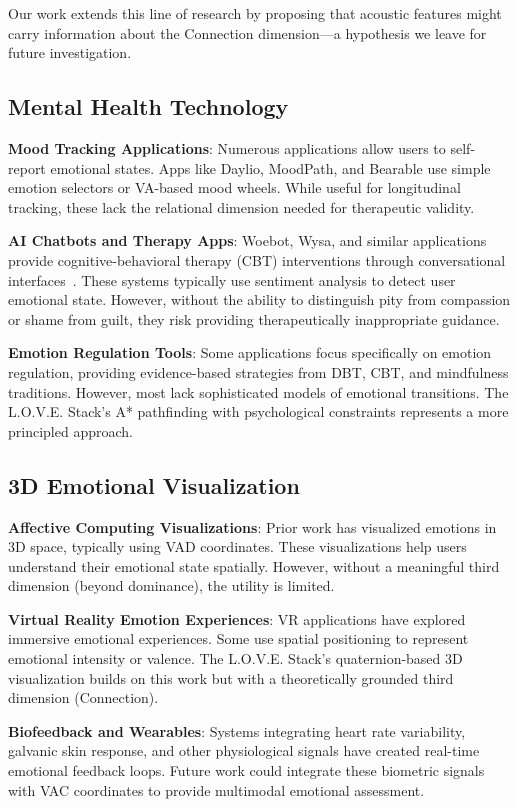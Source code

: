 Our work extends this line of research by proposing that acoustic features might carry information about the Connection dimension—a hypothesis we leave for future investigation.

\subsection{Mental Health Technology}

\textbf{Mood Tracking Applications}: Numerous applications allow users to self-report emotional states. Apps like Daylio, MoodPath, and Bearable use simple emotion selectors or VA-based mood wheels. While useful for longitudinal tracking, these lack the relational dimension needed for therapeutic validity.

\textbf{AI Chatbots and Therapy Apps}: Woebot, Wysa, and similar applications provide cognitive-behavioral therapy (CBT) interventions through conversational interfaces~\cite{fitzpatrick2017}. These systems typically use sentiment analysis to detect user emotional state. However, without the ability to distinguish pity from compassion or shame from guilt, they risk providing therapeutically inappropriate guidance.

\textbf{Emotion Regulation Tools}: Some applications focus specifically on emotion regulation, providing evidence-based strategies from DBT, CBT, and mindfulness traditions. However, most lack sophisticated models of emotional transitions. The L.O.V.E. Stack's A* pathfinding with psychological constraints represents a more principled approach.

\subsection{3D Emotional Visualization}

\textbf{Affective Computing Visualizations}: Prior work has visualized emotions in 3D space, typically using VAD coordinates. These visualizations help users understand their emotional state spatially. However, without a meaningful third dimension (beyond dominance), the utility is limited.

\textbf{Virtual Reality Emotion Experiences}: VR applications have explored immersive emotional experiences. Some use spatial positioning to represent emotional intensity or valence. The L.O.V.E. Stack's quaternion-based 3D visualization builds on this work but with a theoretically grounded third dimension (Connection).

\textbf{Biofeedback and Wearables}: Systems integrating heart rate variability, galvanic skin response, and other physiological signals have created real-time emotional feedback loops. Future work could integrate these biometric signals with VAC coordinates to provide multimodal emotional assessment.

